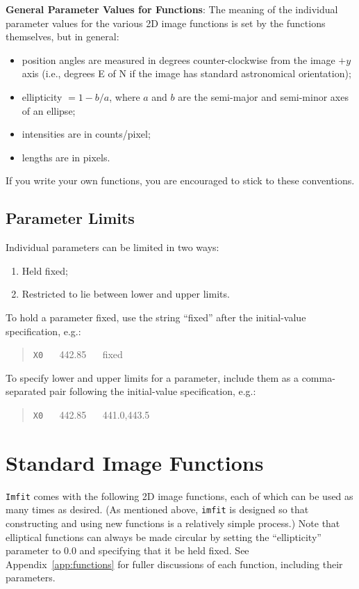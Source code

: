 \documentclass[10pt]{article}
\newcommand{\imfit}{\texttt{imfit}}
\newcommand{\Imfit}{\texttt{Imfit}}
\begin{document}
\textbf{General Parameter Values for Functions}: The meaning of the individual
parameter values for the various 2D image functions is set by the functions
themselves, but in general: 
\begin{itemize}
\item position angles are measured in degrees counter-clockwise
from the image $+y$ axis (i.e., degrees E of N if the image has standard
astronomical orientation);
\item ellipticity $= 1 - b/a$, where $a$ and $b$ are the
semi-major and semi-minor axes of an ellipse;
\item intensities are in counts/pixel;
\item lengths are in pixels. 
\end{itemize}
If you write your own functions, you are encouraged
to stick to these conventions.

\subsection{Parameter Limits}

Individual parameters can be limited in two ways:
\begin{enumerate}
\item Held fixed;
\item Restricted to lie between lower and upper limits.
\end{enumerate}
To hold a parameter fixed, use the string ``fixed'' after the initial-value
specification, e.g.:
\begin{quote}
\texttt{X0} ~~ 442.85 ~~ fixed
\end{quote}
To specify lower and upper limits for a parameter, include them as a comma-separated
pair following the initial-value specification, e.g.:
\begin{quote}
\texttt{X0} ~~ 442.85 ~~ 441.0,443.5
\end{quote}



\section{Standard Image Functions}

\Imfit{} comes with the following 2D image functions, each of
which can be used as many times as desired. (As mentioned above, \imfit{}
is designed so that constructing and using new functions is a relatively
simple process.) Note that elliptical functions can always be made circular
by setting the ``ellipticity'' parameter to 0.0 and specifying that it be
held fixed. See Appendix~\ref{app:functions} for fuller discussions of each
function, including their parameters.
\end{document}
